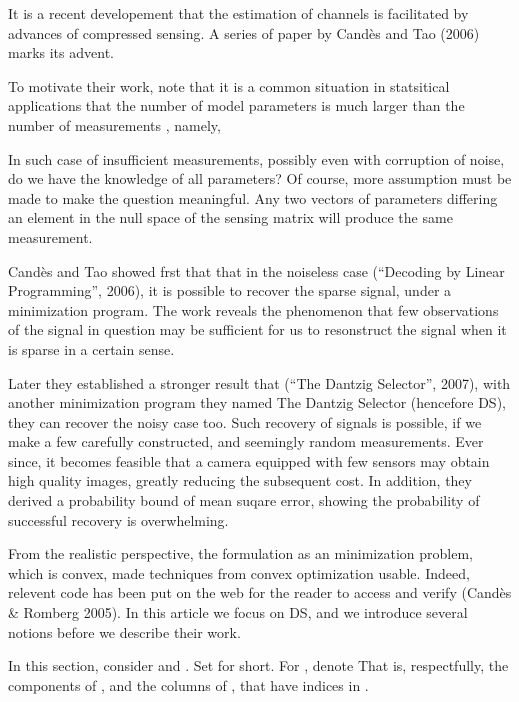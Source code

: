 \stopsection
\startsection [title={The Dantzig Selector}]

It is a recent developement that the estimation of channels is facilitated by advances of compressed sensing.
A series of paper by Cand\`es and Tao (2006) marks its advent.

To motivate their work, note that it is a common situation in statsitical applications that the number of model parameters  is much larger than the number of measurements , namely,


In such case of insufficient measurements, possibly even with corruption of noise, do we have the knowledge of all  parameters?
Of course, more assumption must be made to make the question meaningful.
Any two vectors of parameters differing an element in the null space of the sensing matrix will produce the same measurement.

Cand\`es and Tao showed frst that that in the noiseless case (``Decoding by Linear Programming'', 2006), it is possible to recover the sparse signal, under a  minimization program.
The work reveals the phenomenon that few observations of the signal in question may be sufficient for us to resonstruct the signal when it is sparse in a certain sense.

Later they established a stronger result that (``The Dantzig Selector'', 2007), with another  minimization program they named The Dantzig Selector (hencefore DS), they can recover the noisy case too.
Such recovery of signals is possible, if we make a few carefully constructed, and seemingly random measurements.
Ever since, it becomes feasible that a camera equipped with few sensors may obtain high quality images, greatly reducing the subsequent cost.
In addition, they derived a probability bound of mean suqare error, showing the probability of successful recovery is overwhelming.

From the realistic perspective, the formulation as an  minimization problem, which is convex, made techniques from convex optimization usable.
Indeed, relevent code has been put on the web for the reader to access and verify (Cand\`es \& Romberg 2005).
In this article we focus on DS, and we introduce several notions before we describe their work.

In this section, consider  and .
Set  for short.
For , denote
That is, respectfully, the components of , and the columns of , that have indices in .

